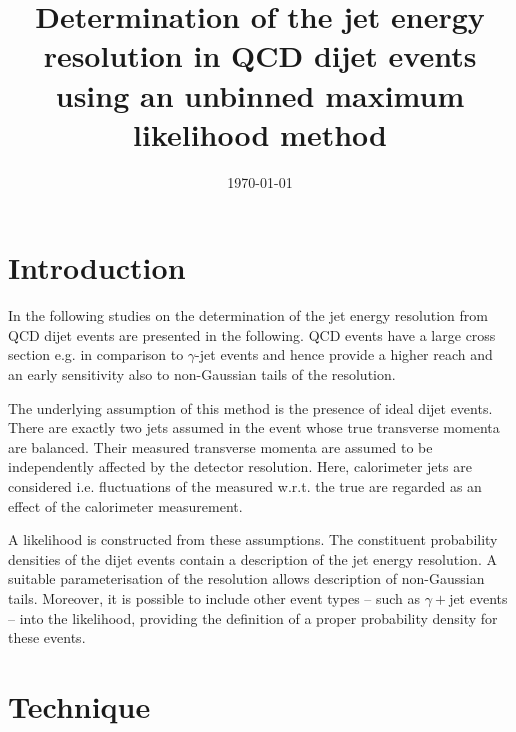 \documentclass[a4paper]{cmspaper} %
\begin{document}
\begin{titlepage}
  \date{\today}
  \title{Determination of the jet energy resolution in QCD dijet
    events using an unbinned maximum likelihood method}
\end{titlepage}

\section{Introduction}
In the following studies on the determination of the jet energy resolution from QCD dijet events are presented in the following.
QCD events have a large cross section e.g. in comparison to $\gamma$-jet events and hence provide a higher \pt reach and an early sensitivity also to non-Gaussian tails of the resolution.

The underlying assumption of this method is the presence of
ideal dijet events.
There are exactly two jets assumed in the event whose true transverse momenta are
balanced.
Their measured transverse momenta are assumed to be
independently affected by the detector resolution.
Here, calorimeter jets are considered i.e. fluctuations of the
measured \pt w.r.t. the true \pt are regarded as an effect of the calorimeter measurement.

A likelihood is constructed from these assumptions.
The constituent probability densities of the dijet events contain a
description of the jet energy resolution.
A suitable parameterisation of the resolution allows description of
non-Gaussian tails.
Moreover, it is possible to include other event types -- such as
$\gamma+$jet events -- into the likelihood, providing the definition
of a proper probability density for these events.


\section{Technique}
\end{document}
